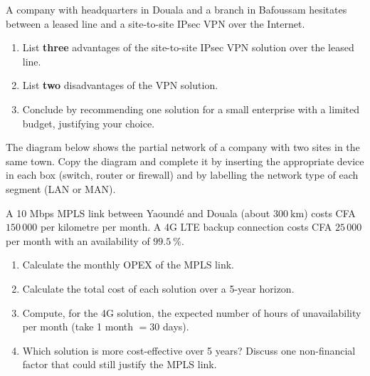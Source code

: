 \documentclass[11pt]{article}
\newcommand{\legende}[1]{\par\vspace{6pt}{\popsemi\fontsize{9}{11.5}\selectfont\color{popmuted}#1}}
\begin{document}
\begin{exercice}
A company with headquarters in Douala and a branch in Bafoussam hesitates between a leased line and a site-to-site IPsec VPN over the Internet.
\begin{enumerate}
\item List \textbf{three} advantages of the site-to-site IPsec VPN solution over the leased line.
\item List \textbf{two} disadvantages of the VPN solution.
\item Conclude by recommending one solution for a small enterprise with a limited budget, justifying your choice.
\end{enumerate}
\end{exercice}

\begin{exercice}
The diagram below shows the partial network of a company with two sites in the same town. Copy the diagram and complete it by inserting the appropriate device in each box (switch, router or firewall) and by labelling the network type of each segment (LAN or MAN).
\begin{popfigure}
\legende{Partial company network to be completed.}
\end{popfigure}
\end{exercice}

\begin{exercice}
A 10 Mbps MPLS link between Yaoundé and Douala (about $300\ \mathrm{km}$) costs CFA $150\,000$ per kilometre per month. A 4G LTE backup connection costs CFA $25\,000$ per month with an availability of $99.5\ \%$.
\begin{enumerate}
\item Calculate the monthly OPEX of the MPLS link.
\item Calculate the total cost of each solution over a 5-year horizon.
\item Compute, for the 4G solution, the expected number of hours of unavailability per month (take 1 month $= 30$ days).
\item Which solution is more cost-effective over 5 years? Discuss one non-financial factor that could still justify the MPLS link.
\end{enumerate}
\end{exercice}
\end{document}
